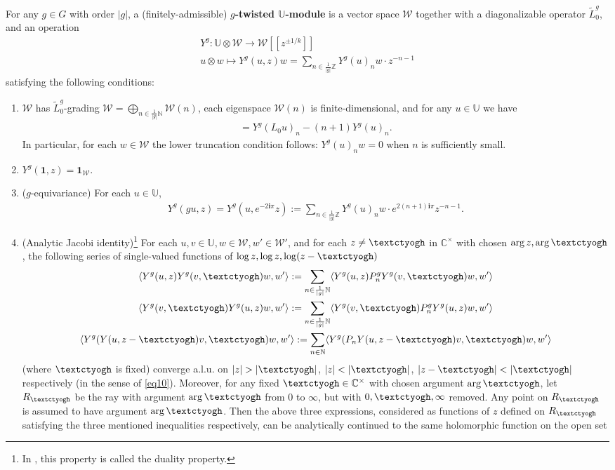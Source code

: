 \documentclass[11pt,b5paper,notitlepage]{article}
\theoremstyle{definition}
\theoremstyle{plain}
\newcommand{\mc}{\mathcal}
\newcommand{\wtd}{\widetilde}
\newcommand{\id}{\mathbf{1}}
\newcommand{\bk}[1]{\langle {#1}\rangle}
\newcommand{\im}{\mathbf{i}}
\newcommand{\Ubb}{\mathbb U}
\newcommand{\Cbb}{\mathbb C}
\newcommand{\Nbb}{\mathbb N}
\newcommand{\Zbb}{\mathbb Z}
\newcommand{\tipaz}{\text{\textctyogh}}
\numberwithin{equation}{subsection}
\begin{document}
For any $g\in G$ with order $|g|$, a (finitely-admissible)  \textbf{$g$-twisted $\Ubb$-module} is a vector space $\mc W$ together with a diagonalizable operator $\wtd L_0^g$, and an operation
\begin{gather*}
Y^g:\Ubb\otimes\mc W\rightarrow	\mc W[[z^{\pm 1/k}]]\\
u\otimes w\mapsto Y^g(u,z)w=\sum_{n\in \frac 1{|g|} \Zbb}Y^g(u)_nw\cdot z^{-n-1}
\end{gather*}
satisfying the following conditions:
\begin{enumerate}
\item $\mc W$ has $\wtd L_0^g$-grading \index{L0g@$\wtd L_0^g$} $\mc W=\bigoplus_{n\in\frac 1{|g|}\Nbb}\mc W(n)$, each eigenspace $\mc W(n)$ is finite-dimensional, and for any $u\in\Ubb$ we have
\begin{align}
[\wtd L_0^g,Y^g(u)_n]=Y^g(L_0u)_n-(n+1)Y^g(u)_n.\label{eq12}	
\end{align}
In particular, for each $w\in\mc W$ the lower truncation condition follows: $Y^g(u)_nw=0$ when $n$ is sufficiently small.
\item $Y^g(\id,z)=\id_{\mc W}$.
\item ($g$-equivariance) For each $u\in\Ubb$,
\begin{align}
Y^g(gu,z)=Y^g(u,e^{-2\im\pi}z):=\sum_{n\in \frac 1{|g|} \Zbb}Y^g(u)_nw\cdot e^{2(n+1)\im\pi}z^{-n-1}.\label{eq21}
\end{align}
\item (Analytic Jacobi identity)\footnote{In \cite[Def. 3.1]{Hua18}, this property is called the duality property.}  For each $u,v\in\Ubb,w\in\mc W,w'\in\mc W'$, and for each $z\neq \tipaz$ in $\Cbb^\times$ with chosen $\arg z,\arg \tipaz$, the following series of single-valued functions of $\log z,\log z,\log(z-\tipaz)$
\begin{gather}
\bk{Y^g(u,z)Y^g(v,\tipaz)w,w'}:=\sum_{n\in\frac 1{|g|}\Nbb}	\bk{Y^g(u,z)P_n^gY^g(v,\tipaz)w,w'}\label{eq13}\\
\bk{Y^g(v,\tipaz)Y^g(u,z)w,w'}:=\sum_{n\in\frac 1{|g|}\Nbb}	\bk{Y^g(v,\tipaz)P_n^gY^g(u,z)w,w'}\label{eq14}\\
\bk{Y^g(Y(u,z-\tipaz)v,\tipaz)w,w'}:=\sum_{n\in\Nbb}	\bk{Y^g(P_nY(u,z-\tipaz)v,\tipaz)w,w'}\label{eq15}
\end{gather}
(where $\tipaz$ is fixed) converge a.l.u.  on $|z|>|\tipaz|$, $|z|<|\tipaz|$, $|z-\tipaz|<|\tipaz|$ respectively (in the sense of \eqref{eq10}). Moreover, for any fixed $\tipaz\in\Cbb^\times$ with chosen argument $\arg \tipaz$, let $R_{\tipaz}$ be the ray with argument $\arg \tipaz$ from $0$ to $\infty$, but with $0,\tipaz,\infty$ removed. Any point on $R_{\tipaz}$ is assumed to have argument $\arg \tipaz$. Then the above three expressions, considered as functions of $z$ defined on $R_{\tipaz}$ satisfying the three mentioned inequalities respectively, can be analytically continued to the same holomorphic function on the open set

\end{enumerate}
\end{document}
